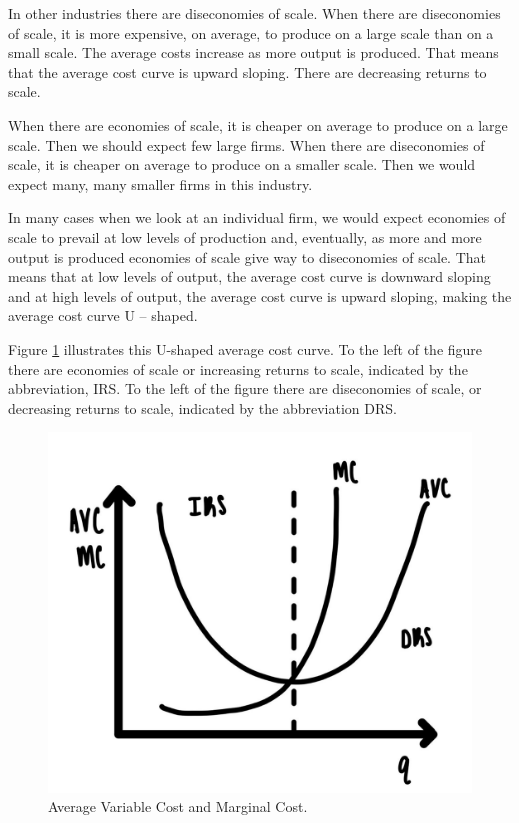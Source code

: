 \documentclass[
]{book}
\begin{document}
In other industries there are diseconomies of scale. When there are diseconomies of scale, it is more expensive, on average, to produce on a large scale than on a small scale. The average costs increase as more output is produced. That means that the average cost curve is upward sloping. There are decreasing returns to scale.

When there are economies of scale, it is cheaper on average to produce on a large scale. Then we should expect few large firms. When there are diseconomies of scale, it is cheaper on average to produce on a smaller scale. Then we would expect many, many smaller firms in this industry.

In many cases when we look at an individual firm, we would expect economies of scale to prevail at low levels of production and, eventually, as more and more output is produced economies of scale give way to diseconomies of scale. That means that at low levels of output, the average cost curve is downward sloping and at high levels of output, the average cost curve is upward sloping, making the average cost curve U -- shaped.

Figure \ref{fig:supply02} illustrates this U-shaped average cost curve. To the left of the figure there are economies of scale or increasing returns to scale, indicated by the abbreviation, IRS. To the left of the figure there are diseconomies of scale, or decreasing returns to scale, indicated by the abbreviation DRS.

\begin{figure}

{\centering \includegraphics[width=0.75\linewidth]{img/supply/fig2} 

}

\caption{Average Variable Cost and Marginal Cost.}\label{fig:supply02}
\end{figure}
\end{document}
